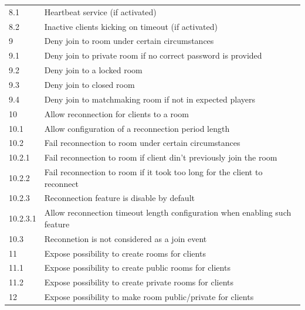 \begin{center}
\begin{longtable}{|l|l|}
8.1      & Heartbeat service (if activated) \\
8.2      & Inactive clients kicking on timeout (if activated) \\
9        & Deny join to room under certain circumstances \\
9.1      & Deny join to private room if no correct password is provided \\
9.2      & Deny join to a locked room \\
9.3      & Deny join to closed room \\
9.4      & Deny join to matchmaking room if not in expected players \\
10        & Allow reconnection for clients to a room \\
10.1      & Allow configuration of a reconnection period length \\
10.2      & Fail reconnection to room under certain circumstances \\
10.2.1    & Fail reconnection to room if client din't previously join the room \\
10.2.2    & Fail reconnection to room if it took too long for the client to reconnect \\
10.2.3    & Reconnection feature is disable by default \\
10.2.3.1  & Allow reconnection timeout length configuration when enabling such feature \\
10.3      & Reconnetion is not considered as a join event \\
11        & Expose possibility to create rooms for clients \\
11.1      & Expose possibility to create public rooms for clients \\
11.2      & Expose possibility to create private rooms for clients \\
12        & Expose possibility to make room public/private for clients \\
\hline

  \end{longtable}
\end{center}

